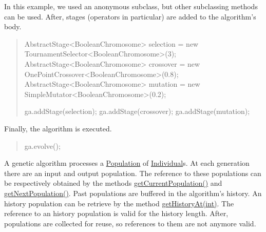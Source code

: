 In this example, we used an anonymous subclass, but other subclassing methods can be used. After, stages (operators in particular) are added to the algorithm's body. 

\begin{quotation}



\begin{DoxyPre}
AbstractStage<BooleanChromosome> selection = new TournamentSelector<BooleanChromosome>(3);
AbstractStage<BooleanChromosome> crossover = new OnePointCrossover<BooleanChromosome>(0.8);
AbstractStage<BooleanChromosome> mutation = new SimpleMutator<BooleanChromosome>(0.2);\end{DoxyPre}



\begin{DoxyPre}ga.addStage(selection);
ga.addStage(crossover);
ga.addStage(mutation);
\end{DoxyPre}


\end{quotation}


Finally, the algorithm is executed. 

\begin{quotation}



\begin{DoxyPre}
ga.evolve();
\end{DoxyPre}


\end{quotation}


A genetic algorithm processes a \hyperlink{}{Population} of \hyperlink{}{Individual}s. At each generation there are an input and output population. The reference to these populations can be respectively obtained by the methods \hyperlink{classjenes_1_1_genetic_algorithm_3_01_t_01extends_01_chromosome_01_4_a855bc56ffb3e1704ced2fdf68cc96d8f}{get\-Current\-Population()} and \hyperlink{classjenes_1_1_genetic_algorithm_3_01_t_01extends_01_chromosome_01_4_a5d22b21350638a64a66d3599b2777982}{get\-Next\-Population()}. Past populations are buffered in the algorithm's history. An history population can be retrieve by the method \hyperlink{classjenes_1_1_genetic_algorithm_3_01_t_01extends_01_chromosome_01_4_a99718490498059da48833dfbdfc8076e}{get\-History\-At(int)}. The reference to an history population is valid for the history length. After, populations are collected for reuse, so references to them are not anymore valid. 

